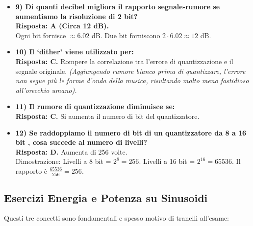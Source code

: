 \begin{itemize}
    \item \textbf{9) Di quanti decibel migliora il rapporto segnale-rumore se aumentiamo la risoluzione di 2 bit?} \\
    \textbf{Risposta: A (Circa 12 dB).} \\
    Ogni bit fornisce $\approx 6.02$ dB. Due bit forniscono $2 \cdot 6.02 \approx 12$ dB.

    \item \textbf{10) Il ‘dither' viene utilizzato per:} \\
    \textbf{Risposta: C.} Rompere la correlazione tra l'errore di quantizzazione e il segnale originale. \textit{(Aggiungendo rumore bianco prima di quantizzare, l'errore non segue più le forme d'onda della musica, risultando molto meno fastidioso all'orecchio umano).}

    \item \textbf{11) Il rumore di quantizzazione diminuisce se:} \\
    \textbf{Risposta: C.} Si aumenta il numero di bit del quantizzatore.

    \item \textbf{12) Se raddoppiamo il numero di bit di un quantizzatore da 8 a 16 bit , cosa succede al numero
    di livelli?} \\
    \textbf{Risposta: D.} Aumenta di 256 volte. \\
    Dimostrazione: Livelli a 8 bit = $2^8 = 256$. Livelli a 16 bit = $2^{16} = 65536$. Il rapporto è $\frac{65536}{256} = 256$.
\end{itemize}

\subsection{Esercizi Energia e Potenza su Sinusoidi}

Questi tre concetti sono fondamentali e spesso motivo di tranelli all'esame:

\begin{center}
\end{center}

